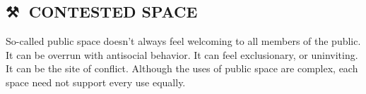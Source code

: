 \subsection*{⚒💎 CONTESTED SPACE{\hfill \sensory}}\label{pat:contested-space}

So-called public space doesn’t always feel welcoming to all members of the public.  It can be overrun with antisocial behavior.  It can feel exclusionary, or uninviting.  It can be the site of conflict.  Although the uses of public space are complex, each space need not support every use equally.
